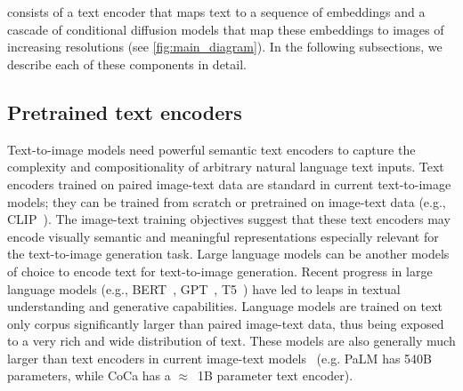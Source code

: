\vspace{-0.25cm}
\section{\name}
\vspace{-0.3cm}
\name consists of a text encoder that maps text to a sequence of embeddings and a cascade of conditional diffusion models that map these embeddings to images of increasing resolutions (see \cref{fig:main_diagram}). In the following subsections, we describe each of these components in detail.



\vspace{-0.3cm}
\subsection{Pretrained text encoders}
\vspace{\postsectionspace}





Text-to-image models need powerful semantic text encoders to capture the complexity and compositionality of arbitrary natural language text inputs. Text encoders trained on paired image-text data are standard in current text-to-image models; they can be trained from scratch \cite{nichol-glide, ramesh-dalle} or pretrained on image-text data \cite{ramesh-dalle2} (e.g., CLIP~\cite{radford-icml-2021}). The image-text training objectives suggest that these text encoders may encode visually semantic and meaningful representations especially relevant for the text-to-image generation task. Large language models can be another models of choice to encode text for text-to-image generation. Recent progress in large language models (e.g., BERT~\cite{devlin-naacl-2019}, GPT~\cite{radford-gpt,radford-gpt2,brown-neurips-2020}, T5~\cite{raffel-jmlr-2020}) have led to leaps in textual understanding and generative capabilities. Language models are trained on text only corpus significantly larger than paired image-text data, thus being exposed to a very rich and wide distribution of text. These models are also generally much larger than text encoders in current image-text models~\cite{radford-icml-2021,jia2021scaling,yu2022coca} (e.g. PaLM \cite{palm-2022} has 540B parameters, while CoCa \cite{yu2022coca} has a $\approx$~1B parameter text encoder).

